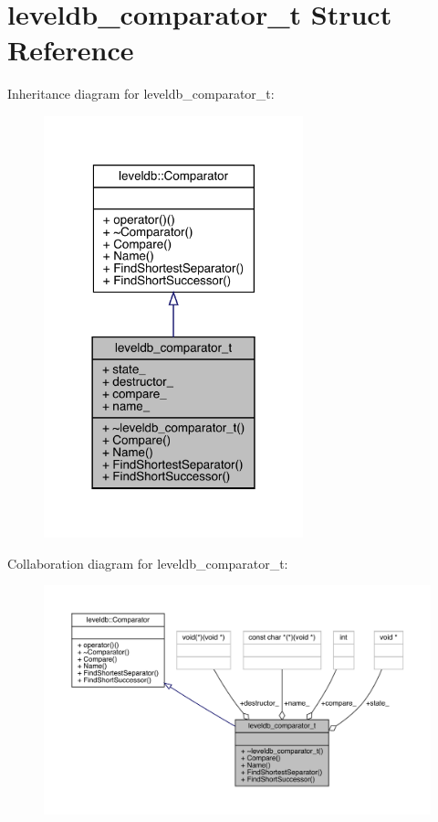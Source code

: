 \hypertarget{structleveldb__comparator__t}{}\section{leveldb\+\_\+comparator\+\_\+t Struct Reference}
\label{structleveldb__comparator__t}


Inheritance diagram for leveldb\+\_\+comparator\+\_\+t\+:
\nopagebreak
\begin{figure}[H]
\begin{center}
\leavevmode
\includegraphics[width=213pt]{structleveldb__comparator__t__inherit__graph}
\end{center}
\end{figure}


Collaboration diagram for leveldb\+\_\+comparator\+\_\+t\+:
\nopagebreak
\begin{figure}[H]
\begin{center}
\leavevmode
\includegraphics[width=350pt]{structleveldb__comparator__t__coll__graph}
\end{center}
\end{figure}
